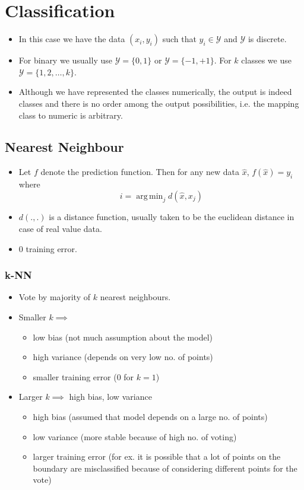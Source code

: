\documentclass{article}
\DeclareMathOperator*{\argmin}{arg\,min}
\newcommand{\mcaly}{\mathcal{Y}}
\newcommand{\xhat}{\hat{x}}
\begin{document}
\section{Classification}

\begin{itemize}
    \item In this case we have the data $(x_i,y_i)$ such that $y_i \in \mcaly$ and $\mcaly$ is discrete.
    \item For binary we usually use $\mcaly=\{0,1\}$ or $\mcaly=\{-1, +1\}$. For $k$ classes we use $\mcaly = \{1,2,\dots,k\}$.
    \item Although we have represented the classes numerically, the output is indeed classes and there is no order among the output possibilities, i.e. the mapping class to numeric is arbitrary.
\end{itemize}

\subsection{Nearest Neighbour}
\begin{itemize}
    \item Let $f$ denote the prediction function. Then for any new data $\xhat$, $f(\xhat) = y_i$ where $$i=\argmin_j d(\xhat, x_j)$$
    \item $d(.,.)$ is a distance function, usually taken to be the euclidean distance in case of real value data.
    \item 0 training error.
\end{itemize}
\subsubsection{k-NN}
\begin{itemize}
    \item Vote by majority of $k$ nearest neighbours.
    \item Smaller $k \implies$ 
        \begin{itemize}
            \item low bias (not much assumption about the model)
            \item high variance (depends on very low no. of points)
            \item smaller training error (0 for $k=1$)
        \end{itemize}
    \item Larger $k \implies$ high bias, low variance
        \begin{itemize}
            \item high bias (assumed that model depends on a large no. of points)
            \item low variance (more stable because of high no. of voting)
            \item larger training error (for ex. it is possible that a lot of points on the boundary are misclassified because of considering different points for the vote)
        \end{itemize}
\end{itemize}
\end{document}
